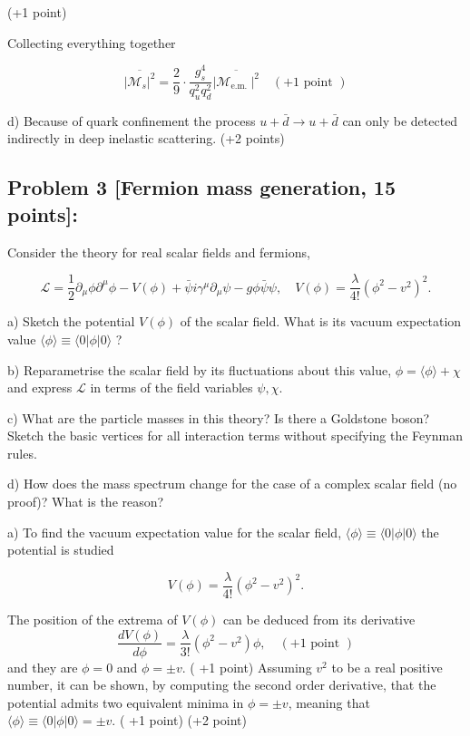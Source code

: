 \documentclass[10pt, letterpaper]{article}
\begin{document}
(+1 point)

Collecting everything together

$$
\overline{\left|\mathcal{M}_s\right|^2}=\frac{2}{9} \cdot \frac{g_s^4}{q_u^2 q_d^2} \overline{\left|\mathcal{M}_{\text {e.m. }}\right|^2} \quad(+1 \text { point })
$$

d) Because of quark confinement the process $u+\bar{d} \rightarrow u+\bar{d}$ can only be detected indirectly in deep inelastic scattering. (+2 points)


\subsection{Problem 3 [Fermion mass generation, 15 points]:}


Consider the theory for real scalar fields and fermions,

$$
\mathcal{L}=\frac{1}{2} \partial_\mu \phi \partial^\mu \phi-V(\phi)+\bar{\psi} i \gamma^\mu \partial_\mu \psi-g \phi \bar{\psi} \psi, \quad V(\phi)=\frac{\lambda}{4!}\left(\phi^2-v^2\right)^2 .
$$

a) Sketch the potential $V(\phi)$ of the scalar field. What is its vacuum expectation value $\langle\phi\rangle \equiv\langle 0| \phi|0\rangle$ ?

b) Reparametrise the scalar field by its fluctuations about this value, $\phi=\langle\phi\rangle+\chi$ and express $\mathcal{L}$ in terms of the field variables $\psi, \chi$.

c) What are the particle masses in this theory? Is there a Goldstone boson? Sketch the basic vertices for all interaction terms without specifying the Feynman rules.

d) How does the mass spectrum change for the case of a complex scalar field (no proof)? What is the reason?



a) To find the vacuum expectation value for the scalar field, $\langle\phi\rangle \equiv\langle 0| \phi|0\rangle$ the potential is studied

$$
V(\phi)=\frac{\lambda}{4!}\left(\phi^2-v^2\right)^2 .
$$


The position of the extrema of $V(\phi)$ can be deduced from its derivative
$$
\frac{d V(\phi)}{d \phi}=\frac{\lambda}{3!}\left(\phi^2-v^2\right) \phi, \quad(+1 \text { point })
$$
and they are $\phi=0$ and $\phi= \pm v$. ( +1 point)
Assuming $v^2$ to be a real positive number, it can be shown, by computing the second order derivative, that the potential admits two equivalent minima in $\phi= \pm v$, meaning that $\langle\phi\rangle \equiv\langle 0| \phi|0\rangle= \pm v$. ( +1 point)
(+2 point)
\end{document}
